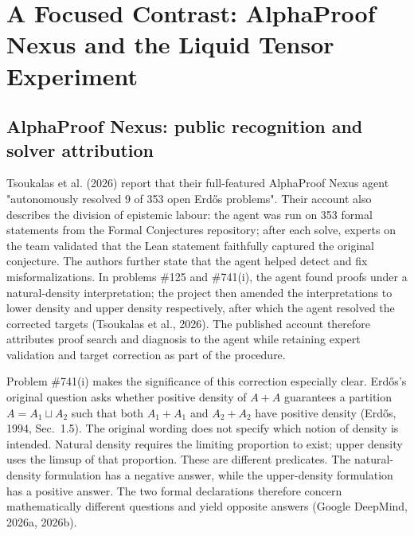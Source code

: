 \documentclass[pdflatex,sn-apa]{sn-jnl}
\begin{document}
\section{A Focused Contrast: AlphaProof Nexus and the Liquid Tensor Experiment}

\subsection{AlphaProof Nexus: public recognition and solver attribution}

Tsoukalas et al. (2026) report that their full-featured AlphaProof Nexus agent "autonomously resolved 9 of 353 open Erdős problems". Their account also describes the division of epistemic labour: the agent was run on 353 formal statements from the Formal Conjectures repository; after each solve, experts on the team validated that the Lean statement faithfully captured the original conjecture. The authors further state that the agent helped detect and fix misformalizations. In problems \#125 and \#741(i), the agent found proofs under a natural-density interpretation; the project then amended the interpretations to lower density and upper density respectively, after which the agent resolved the corrected targets (Tsoukalas et al., 2026). The published account therefore attributes proof search and diagnosis to the agent while retaining expert validation and target correction as part of the procedure.

Problem \#741(i) makes the significance of this correction especially clear. Erdős's original question asks whether positive density of \(A+A\) guarantees a partition \(A=A_1\sqcup A_2\) such that both \(A_1+A_1\) and \(A_2+A_2\) have positive density (Erdős, 1994, Sec.~1.5). The original wording does not specify which notion of density is intended. Natural density requires the limiting proportion to exist; upper density uses the limsup of that proportion. These are different predicates. The natural-density formulation has a negative answer, while the upper-density formulation has a positive answer. The two formal declarations therefore concern mathematically different questions and yield opposite answers (Google DeepMind, 2026a, 2026b).
\end{document}
